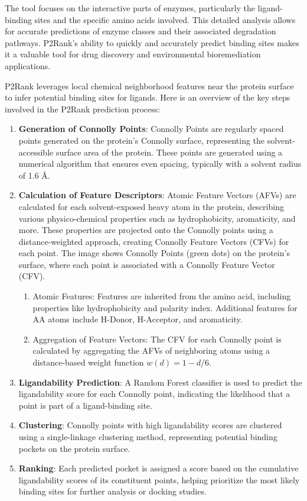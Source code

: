 The tool focuses on the interactive parts of enzymes, particularly the ligand-binding sites and the specific amino acids involved. This detailed analysis allows for accurate predictions of enzyme classes and their associated degradation pathways. P2Rank's ability to quickly and accurately predict binding sites makes it a valuable tool for drug discovery and environmental bioremediation applications.

P2Rank leverages local chemical neighborhood features near the protein surface to infer potential binding sites for ligands. Here is an overview of the key steps involved in the P2Rank prediction process:

\begin{enumerate} 
    \item \textbf{Generation of Connolly Points}: Connolly Points are regularly spaced points generated on the protein’s Connolly surface, representing the solvent-accessible surface area of the protein. These points are generated using a numerical algorithm that ensures even spacing, typically with a solvent radius of 1.6 Å.
    \item \textbf{Calculation of Feature Descriptors}: Atomic Feature Vectors (AFVs) are calculated for each solvent-exposed heavy atom in the protein, describing various physico-chemical properties such as hydrophobicity, aromaticity, and more. These properties are projected onto the Connolly points using a distance-weighted approach, creating Connolly Feature Vectors (CFVs) for each point. The image shows Connolly Points (green dots) on the protein’s surface, where each point is associated with a Connolly Feature Vector (CFV).
    \begin{enumerate}
        \item Atomic Features: Features are inherited from the amino acid, including properties like hydrophobicity and polarity index. Additional features for AA atoms include H-Donor, H-Acceptor, and aromaticity.
        \item Aggregation of Feature Vectors: The CFV for each Connolly point is calculated by aggregating the AFVs of neighboring atoms using a distance-based weight function $w(d) = 1 - d / 6$.
    \end{enumerate}
    \item \textbf{Ligandability Prediction}: A Random Forest classifier is used to predict the ligandability score for each Connolly point, indicating the likelihood that a point is part of a ligand-binding site.
    \item \textbf{Clustering}: Connolly points with high ligandability scores are clustered using a single-linkage clustering method, representing potential binding pockets on the protein surface.
    \item \textbf{Ranking}: Each predicted pocket is assigned a score based on the cumulative ligandability scores of its constituent points, helping prioritize the most likely binding sites for further analysis or docking studies.
\end{enumerate}

